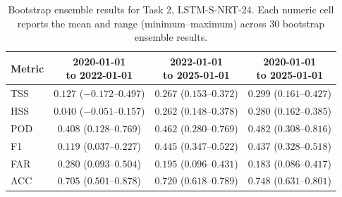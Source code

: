 \begin{table}[htbp]
\centering
\small
\caption{Bootstrap ensemble results for Task 2, LSTM-S-NRT-24. Each numeric cell reports the mean and range (minimum--maximum) across 30 bootstrap ensemble results.}
\label{tab:app-task2-lstm-s-nrt-24}
\begin{tabular}{lccc}
\toprule
Metric & \shortstack{2020-01-01\\to 2022-01-01} & \shortstack{2022-01-01\\to 2025-01-01} & \shortstack{2020-01-01\\to 2025-01-01} \\
\midrule
TSS & $0.127$ ($-0.172$--$0.497$) & $0.267$ ($0.153$--$0.372$) & $0.299$ ($0.161$--$0.427$) \\
HSS & $0.040$ ($-0.051$--$0.157$) & $0.262$ ($0.148$--$0.378$) & $0.280$ ($0.162$--$0.385$) \\
POD & $0.408$ ($0.128$--$0.769$) & $0.462$ ($0.280$--$0.769$) & $0.482$ ($0.308$--$0.816$) \\
F1 & $0.119$ ($0.037$--$0.227$) & $0.445$ ($0.347$--$0.522$) & $0.437$ ($0.328$--$0.518$) \\
FAR & $0.280$ ($0.093$--$0.504$) & $0.195$ ($0.096$--$0.431$) & $0.183$ ($0.086$--$0.417$) \\
ACC & $0.705$ ($0.501$--$0.878$) & $0.720$ ($0.618$--$0.789$) & $0.748$ ($0.631$--$0.801$) \\
\bottomrule
\end{tabular}
\end{table}
\clearpage

